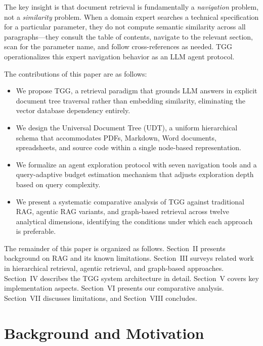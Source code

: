 \documentclass[conference]{IEEEtran}
\begin{document}
The key insight is that document retrieval is fundamentally a \textit{navigation} problem, not a \textit{similarity} problem. When a domain expert searches a technical specification for a particular parameter, they do not compute semantic similarity across all paragraphs---they consult the table of contents, navigate to the relevant section, scan for the parameter name, and follow cross-references as needed. TGG operationalizes this expert navigation behavior as an LLM agent protocol.

The contributions of this paper are as follows:
\begin{itemize}
    \item We propose TGG, a retrieval paradigm that grounds LLM answers in explicit document tree traversal rather than embedding similarity, eliminating the vector database dependency entirely.
    \item We design the Universal Document Tree (UDT), a uniform hierarchical schema that accommodates PDFs, Markdown, Word documents, spreadsheets, and source code within a single node-based representation.
    \item We formalize an agent exploration protocol with seven navigation tools and a query-adaptive budget estimation mechanism that adjusts exploration depth based on query complexity.
    \item We present a systematic comparative analysis of TGG against traditional RAG, agentic RAG variants, and graph-based retrieval across twelve analytical dimensions, identifying the conditions under which each approach is preferable.
\end{itemize}

The remainder of this paper is organized as follows. Section~II presents background on RAG and its known limitations. Section~III surveys related work in hierarchical retrieval, agentic retrieval, and graph-based approaches. Section~IV describes the TGG system architecture in detail. Section~V covers key implementation aspects. Section~VI presents our comparative analysis. Section~VII discusses limitations, and Section~VIII concludes.

\section{Background and Motivation}
\end{document}
